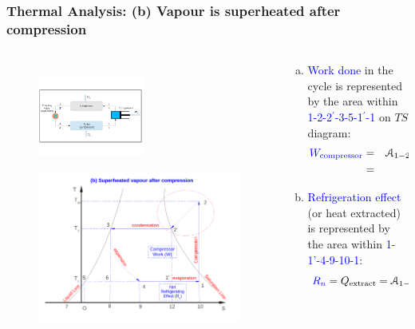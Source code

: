 \documentclass[10pt,compress]{beamer}
\begin{document}
\begin{frame}
 \frametitle{Thermal Analysis: (b) Vapour is superheated after compression}
 \begin{columns}
  \begin{column}[c]{0.35\linewidth}
   \begin{figure}%
     \vbox{
      \includegraphics[width=3.5cm,height=3.5cm,clip]{./Pics/Overview_Refrig12}
      \vspace{-.6cm}
      \includegraphics[width=4.cm,height=4.cm,clip]{./Pics/Overview_Refrig15}}
   \end{figure}  
  \end{column}  
  \begin{column}[c]{0.65\linewidth}
   \begin{enumerate}[(a)]
    \item <1-> \textcolor{blue}{Work done} in the cycle is represented by the area within \textcolor{blue}{1-2-2$^{\prime}$-3-5-1$^{\prime}$-1} on $TS$ diagram:
      \begin{eqnarray} 
       \textcolor{blue}{W_{\text{compressor}}} &=& \mathcal{A}_{1-2-2'-3-5-1'-1} \nonumber \\
         &=& \textcolor{blue}{H_{2}-H_{1}} \nonumber
      \end{eqnarray}
    \item <2-> \textcolor{blue}{Refrigeration effect} (or heat extracted) is represented by the area within \textcolor{blue}{1-1'-4-9-10-1}:
      \begin{displaymath}
       \textcolor{blue}{R_{n}} = Q_{\text{extract}} = \mathcal{A}_{1-1'-4-9-10-1} = \textcolor{blue}{H_{1}-H_{4}}
      \end{displaymath}
   \end{enumerate}
  \end{column}  
 \end{columns}
\end{frame}
\end{document}
